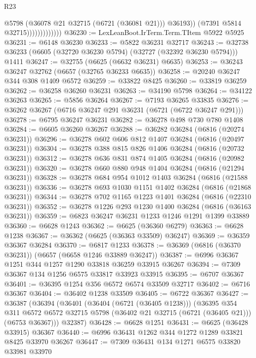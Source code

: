 \begin{lexlean}{R23}
\begin{coremodule}
                                @5798
                                (@36078 @21 @32715 (@6721 (@36081 @21)))
                                @36193))
                            (@7391 @5814 @32715)))))))))))))
@36230 := LexLeanBoot.IrTerm.Term.TItem @5922 @5925
@36231 := @6148 @36230
@36233 := @5822 @36231 @32717
@36243 := @32738 @36233 (@6605 (@32720 @36230 @5794) (@32727 (@32392 @36230 @5794))) @1411
@36247 := @32755 (@6625 (@6632 @36231) @6635)
@36253 := @36243 @36247 @32762 (@6657 (@32765 @36233 @6635))
@36258 := @20240 @36247 @344 @308 @1409 @6572
@36259 := @33822 @8425
@36260 := @33819 @36259
@36262 := @36258 @36260 @36231
@36263 := @34190 @5798
@36264 := @34122 @36263
@36265 := @5856 @36264
@36267 := @7193 @36265 @33835
@36276 := @36262 @36267 (@6716 @36247 @291 @36231 (@6721 (@6722 @36247 @291)))
@36278 := @6795 @36247 @36231
@36282 := @36278 @498 @730 @780 @1408
@36284 := @6605 @36260 @36267
@36288 := @36282 @36284 (@6816 (@20274 @36231))
@36296 := @36278 @602 @606 @812 @1407 @36284 (@6816 (@20497 @36231))
@36304 := @36278 @388 @815 @826 @1406 @36284 (@6816 (@20732 @36231))
@36312 := @36278 @636 @831 @874 @1405 @36284 (@6816 (@20982 @36231))
@36320 := @36278 @660 @880 @948 @1404 @36284 (@6816 (@21294 @36231))
@36328 := @36278 @684 @954 @1012 @1403 @36284 (@6816 (@21588 @36231))
@36336 := @36278 @693 @1030 @1151 @1402 @36284 (@6816 (@21868 @36231))
@36344 := @36278 @702 @1165 @1223 @1401 @36284 (@6816 (@22310 @36231))
@36352 := @36278 @1226 @293 @1230 @1400 @36284 (@6816 (@36163 @36231))
@36359 := @6823 @36247 @36231 @1233 @1246 @1291 @1399 @33889
@36360 := @6628 @1243
@36362 := @6625 (@36360 @6279)
@36363 := @6628 @1238
@36367 := @36362 (@6625 (@36363 @33509) @36247)
@36369 := @36359 @36367 @36284
@36370 := @6817 @1233
@36378 := @36369 (@6816 (@36370 @36231)) (@6657 (@6658 @1246 @33889 @36247))
@36387 := @6996 @36367 @1251 @344 @1257 @1290 @33818 @36259 @33915 @36267
@36394 := @7309 @36367 @134 @1256 @6575 @33817 @33923 @33915
@36395 := @6707 @36367
@36401 := @36395 @1254 @356 @6572 @6574 @33509 @32717
@36402 := @6716 @36367
@36404 := @36402 @1238 @33509
@36405 := @6722 @36367
@36427 := @36387
    (@36394
      (@36401
        (@36404 (@6721 (@36405 @1238)))
        (@36395
          @354
          @311
          @6572
          @6572
          @32715
          @5798
          (@36402 @21 @32715 (@6721 (@36405 @21)))
          (@6753 @36367)))
      @32387)
@36428 := @6628 @1251
@36431 := @6625 (@36428 @33915) @36367
@36440 := @6996 @36431 @1262 @344 @1272 @1289 @33821 @8425 @33970 @36267
@36447 := @7309 @36431 @134 @1271 @6575 @33820 @33981 @33970

\end{coremodule}
\end{lexlean}
